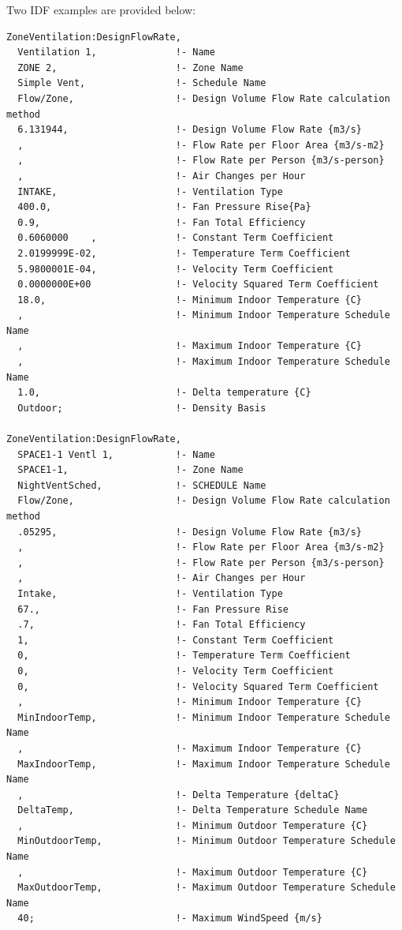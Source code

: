 Two IDF examples are provided below:

\begin{lstlisting}
ZoneVentilation:DesignFlowRate,
  Ventilation 1,              !- Name
  ZONE 2,                     !- Zone Name
  Simple Vent,                !- Schedule Name
  Flow/Zone,                  !- Design Volume Flow Rate calculation method
  6.131944,                   !- Design Volume Flow Rate {m3/s}
  ,                           !- Flow Rate per Floor Area {m3/s-m2}
  ,                           !- Flow Rate per Person {m3/s-person}
  ,                           !- Air Changes per Hour
  INTAKE,                     !- Ventilation Type
  400.0,                      !- Fan Pressure Rise{Pa}
  0.9,                        !- Fan Total Efficiency
  0.6060000    ,              !- Constant Term Coefficient
  2.0199999E-02,              !- Temperature Term Coefficient
  5.9800001E-04,              !- Velocity Term Coefficient
  0.0000000E+00               !- Velocity Squared Term Coefficient
  18.0,                       !- Minimum Indoor Temperature {C}
  ,                           !- Minimum Indoor Temperature Schedule Name
  ,                           !- Maximum Indoor Temperature {C}
  ,                           !- Maximum Indoor Temperature Schedule Name
  1.0,                        !- Delta temperature {C}
  Outdoor;                    !- Density Basis

ZoneVentilation:DesignFlowRate,
  SPACE1-1 Ventl 1,           !- Name
  SPACE1-1,                   !- Zone Name
  NightVentSched,             !- SCHEDULE Name
  Flow/Zone,                  !- Design Volume Flow Rate calculation method
  .05295,                     !- Design Volume Flow Rate {m3/s}
  ,                           !- Flow Rate per Floor Area {m3/s-m2}
  ,                           !- Flow Rate per Person {m3/s-person}
  ,                           !- Air Changes per Hour
  Intake,                     !- Ventilation Type
  67.,                        !- Fan Pressure Rise
  .7,                         !- Fan Total Efficiency
  1,                          !- Constant Term Coefficient
  0,                          !- Temperature Term Coefficient
  0,                          !- Velocity Term Coefficient
  0,                          !- Velocity Squared Term Coefficient
  ,                           !- Minimum Indoor Temperature {C}
  MinIndoorTemp,              !- Minimum Indoor Temperature Schedule Name
  ,                           !- Maximum Indoor Temperature {C}
  MaxIndoorTemp,              !- Maximum Indoor Temperature Schedule Name
  ,                           !- Delta Temperature {deltaC}
  DeltaTemp,                  !- Delta Temperature Schedule Name
  ,                           !- Minimum Outdoor Temperature {C}
  MinOutdoorTemp,             !- Minimum Outdoor Temperature Schedule Name
  ,                           !- Maximum Outdoor Temperature {C}
  MaxOutdoorTemp,             !- Maximum Outdoor Temperature Schedule Name
  40;                         !- Maximum WindSpeed {m/s}
\end{lstlisting}

